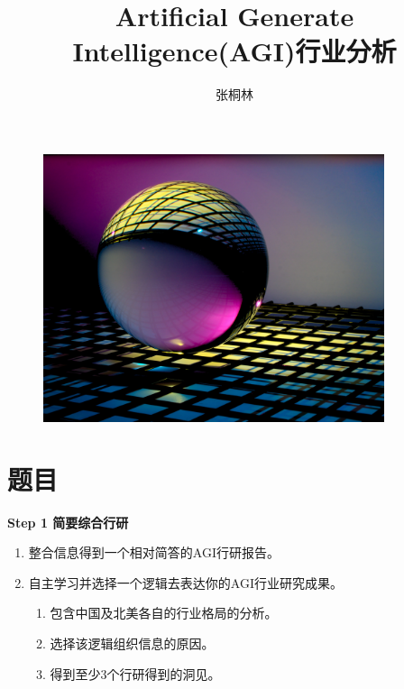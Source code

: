 \documentclass[fontset=overleaf，12pt]{ctexart}
\title{Artificial Generate Intelligence(AGI){\songti 行业分析}}
\author{\heiti 张桐林}
\date{}
\begin{document}
\maketitle



\begin{figure}[htbp]
    \centering
    \includegraphics[width=10cm]{michael-dziedzic-qDG7XKJLKbs-unsplash.jpg}
    \label{fig:enter-label}
\end{figure}



\clearpage



\section*{题目}


\textbf{Step 1 简要综合行研}
\begin{enumerate}
    \item  整合信息得到一个相对简答的AGI行研报告。
    \item   自主学习并选择一个逻辑去表达你的AGI行业研究成果。
    \begin{enumerate}
        \item 包含中国及北美各自的行业格局的分析。
        \item 选择该逻辑组织信息的原因。
        \item 得到至少3个行研得到的洞见。
    \end{enumerate}
\end{enumerate}
\end{document}
